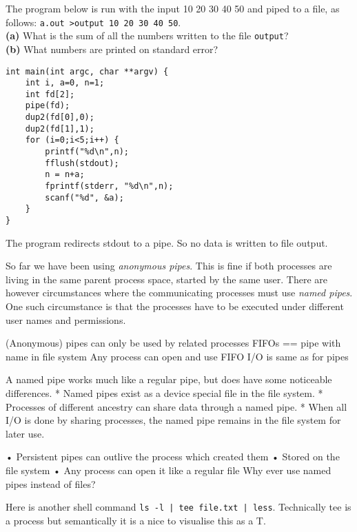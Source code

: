 \frmrule

\begin{example}
The program below is run with the input 10 20 30 40 50 and piped to a file, as follows: 
\lstinline{a.out >output 10 20 30 40 50}. \\
\textbf{(a)} What is the sum of all the numbers written to the file \lstinline{output}? \\
\textbf{(b)} What numbers are printed on standard error?

\begin{lstlisting}
int main(int argc, char **argv) {
    int i, a=0, n=1;
    int fd[2];
    pipe(fd);
    dup2(fd[0],0);
    dup2(fd[1],1);
    for (i=0;i<5;i++) {
        printf("%d\n",n);
        fflush(stdout);
        n = n+a;
        fprintf(stderr, "%d\n",n);
        scanf("%d", &a);
    }
}
\end{lstlisting}
\end{example}


The program redirects stdout to a pipe. So no data is written to file output.

\frmrule

So far we have been using \textit{anonymous pipes}. This is fine if both 
processes are living in the same parent process space, 
started by the same user. 
There are however circumstances where the communicating processes
must use \textit{named pipes}. One such circumstance is that the processes have to be executed under different user names and permissions.


(Anonymous) pipes can only be used by related 
processes
FIFOs == pipe with name in file system
Any process can open and use FIFO
I/O is same as for pipes

A named pipe works much like a regular pipe, but does have
some noticeable differences.
* Named pipes exist as a device special file in the file
system.
* Processes of different ancestry can share data through a
named pipe.
* When all I/O is done by sharing processes, the named 
pipe remains in the file system for later use.

• Persistent pipes can outlive the process which 
created them
• Stored on the file system
• Any process can open it like a regular file
 Why ever use named pipes instead of files?


\begin{example}
Here is another shell command \lstinline{ls -l | tee file.txt | less}.
Technically tee is a process but semantically it is a nice to
visualise this as a T. 
\end{example}



